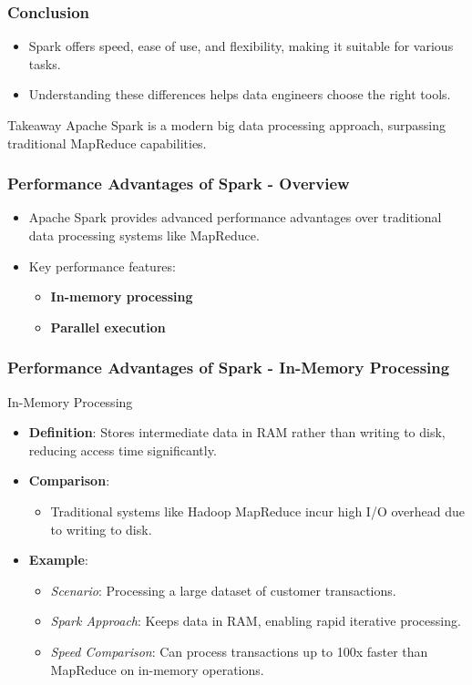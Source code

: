 \documentclass[aspectratio=169]{beamer}
\begin{document}
\begin{frame}[fragile]
    \frametitle{Conclusion}
    \begin{itemize}
        \item Spark offers speed, ease of use, and flexibility, making it suitable for various tasks.
        \item Understanding these differences helps data engineers choose the right tools.
    \end{itemize}
    \begin{block}{Takeaway}
        Apache Spark is a modern big data processing approach, surpassing traditional MapReduce capabilities.
    \end{block}
\end{frame}

\begin{frame}[fragile]
    \frametitle{Performance Advantages of Spark - Overview}
    \begin{itemize}
        \item Apache Spark provides advanced performance advantages over traditional data processing systems like MapReduce.
        \item Key performance features:
        \begin{itemize}
            \item \textbf{In-memory processing}
            \item \textbf{Parallel execution}
        \end{itemize}
    \end{itemize}  
\end{frame}

\begin{frame}[fragile]
    \frametitle{Performance Advantages of Spark - In-Memory Processing}
    \begin{block}{In-Memory Processing}
        \begin{itemize}
            \item \textbf{Definition}: Stores intermediate data in RAM rather than writing to disk, reducing access time significantly.
            \item \textbf{Comparison}:
            \begin{itemize}
                \item Traditional systems like Hadoop MapReduce incur high I/O overhead due to writing to disk.
            \end{itemize}
            \item \textbf{Example}: 
            \begin{itemize}
                \item \textit{Scenario}: Processing a large dataset of customer transactions.
                \item \textit{Spark Approach}: Keeps data in RAM, enabling rapid iterative processing.
                \item \textit{Speed Comparison}: Can process transactions up to 100x faster than MapReduce on in-memory operations.
            \end{itemize}
        \end{itemize}
    \end{block}
\end{frame}
\end{document}
